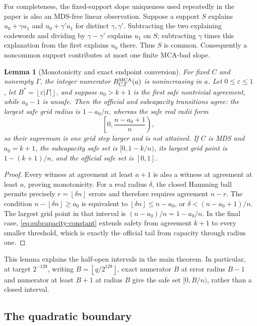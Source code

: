 \documentclass[11pt,a4paper]{amsart}
\numberwithin{equation}{section}
\newtheorem{lemma}[lemma]{Lemma}
\theoremstyle{remark}
\newcommand{\eps}{\varepsilon}
\newcommand{\floor}[1]{\left\lfloor #1\right\rfloor}
\begin{document}
For completeness, the fixed-support slope uniqueness used repeatedly in
the paper is also an MDS-free linear observation.  Suppose a support
\(S\) explains \(u_0+\gamma u_1\) and \(u_0+\gamma' u_1\) for distinct
\(\gamma,\gamma'\).  Subtracting the two explaining codewords and dividing
by \(\gamma-\gamma'\) explains \(u_1\) on \(S\); subtracting
\(\gamma\) times this explanation from the first explains \(u_0\) there.
Thus \(S\) is common.  Consequently a noncommon support contributes at
most one finite MCA-bad slope.

\begin{lemma}[Monotonicity and exact endpoint conversion]
\label{lem:appendix-endpoint}
For fixed \(C\) and nonempty \(\Gamma\), the integer numerator
\(B_{C,\Gamma}^{\rm MCA}(a)\) is nonincreasing in \(a\).  Let
\(0\le\eps\le1\), let
\(B^*=\floor{\eps|\Gamma|}\), and suppose \(a_0>k+1\) is the first safe
nontrivial agreement, while \(a_0-1\) is unsafe.  Then the official and
subcapacity transitions agree: the largest safe grid radius is
\(1-a_0/n\), whereas the safe real radii form
\[
                 \left[0,\frac{n-a_0+1}{n}\right),
\]
so their supremum is one grid step larger and is not attained.
If \(C\) is MDS and \(a_0=k+1\), the subcapacity safe set is
\([0,1-k/n)\), its largest grid point is \(1-(k+1)/n\), and the official
safe set is \([0,1]\).
\end{lemma}

\begin{proof}
Every witness at agreement at least \(a+1\) is also a witness at
agreement at least \(a\), proving monotonicity.  For a real radius
\(\delta\), the closed Hamming ball permits precisely
\(r=\floor{\delta n}\) errors and therefore requires agreement
\(n-r\).  The condition \(n-\floor{\delta n}\ge a_0\) is equivalent to
\(\floor{\delta n}\le n-a_0\), or
\(\delta<(n-a_0+1)/n\).  The largest grid point in that interval is
\((n-a_0)/n=1-a_0/n\).
In the final case, \cref{eq:subcapacity-constant} extends safety from
agreement \(k+1\) to every smaller threshold, which is exactly the official
tail from capacity through radius one.
\end{proof}

This lemma explains the half-open intervals in the main theorem.  In
particular, at target \(2^{-128}\), writing
\(B=\floor{q/2^{128}}\), exact numerator \(B\) at error radius \(B-1\)
and numerator at least \(B+1\) at radius \(B\) give the safe set
\([0,B/n)\), rather than a closed interval.

\subsection{The quadratic boundary}
\end{document}
